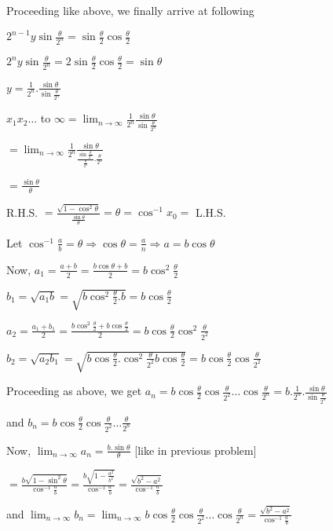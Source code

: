  Proceeding like above, we finally arrive at following

  $2^{n - 1}y\sin\frac{\theta}{2^n} = \sin\frac{\theta}{2}\cos\frac{\theta}{2}$

  $2^ny\sin\frac{\theta}{2^n} = 2\sin\frac{\theta}{2}\cos\frac{\theta}{2} = \sin\theta$

  $y = \frac{1}{2^n}.\frac{\sin\theta}{\sin\frac{\theta}{2^n}}$

  $x_1x_2\ldots$ to $\infty = \lim_{n\to \infty} \frac{1}{2^n}\frac{\sin\theta}{\sin\frac{\theta}{2^n}}$

  $= \lim_{n\to\infty}\frac{1}{2^n}\frac{\sin\theta}{\frac{\sin\frac{\theta}{2^n}}{\frac{\theta}{2^n}}.\frac{\theta}{2^n}}$

  $= \frac{\sin\theta}{\theta}$

  R.H.S. $= \frac{\sqrt{1 - \cos^2\theta}}{\frac{\sin\theta}{\theta}} = \theta = \cos^{-1}x_0 =$ L.H.S.

\item Let $\cos^{-1}\frac{a}{b} = \theta \Rightarrow \cos\theta = \frac{a}{n}\Rightarrow a = b\cos\theta$

  Now, $a_1 = \frac{a + b}{2} = \frac{b\cos\theta + b}{2} = b\cos^2\frac{\theta}{2}$

  $b_1 = \sqrt{a_1b} = \sqrt{b\cos^2\frac{\theta}{2}.b} = b\cos\frac{\theta}{2}$

  $a_2 = \frac{a_1 + b_1}{2} = \frac{b\cos^2\frac{\theta}{2} + b\cos\frac{\theta}{2}}{2} =
  b\cos\frac{\theta}{2}\cos^2\frac{\theta}{2^2}$

  $b_2 = \sqrt{a_2b_1} = \sqrt{b\cos\frac{\theta}{2}.\cos^2\frac{\theta}{2^2}b\cos\frac{\theta}{2}} =
  b\cos\frac{\theta}{2}\cos\frac{\theta}{2^2}$

  Proceeding as above, we get $a_n = b\cos\frac{\theta}{2}\cos\frac{\theta}{2^2}\ldots\cos\frac{\theta}{2^n} =
  b.\frac{1}{2^n}.\frac{\sin\theta}{\sin\frac{\theta}{2^n}}$

  and $b_n = b\cos\frac{\theta}{2}\cos\frac{\theta}{2^2}\ldots\frac{\theta}{2^n}$

  Now, $\lim_{n\to\infty}a_n = \frac{b.\sin\theta}{\theta}$ [like in previous problem]

  $= \frac{b\sqrt{1 - \sin^2\theta}}{\cos^{-1}\frac{a}{b}} = \frac{b\sqrt{1 - \frac{a^2}{b^2}}}{\cos^{-1}\frac{a}{b}} =
  \frac{\sqrt{b^2 - a^2}}{\cos^{-1}\frac{a}{b}}$

  and $\lim_{n\to\infty}b_n = \lim_{n\to\infty}b\cos\frac{\theta}{2}\cos\frac{\theta}{2^2}\ldots\cos\frac{\theta}{2^n} =
  \frac{\sqrt{b^2 - a^2}}{\cos^{-1}\frac{a}{b}}$

